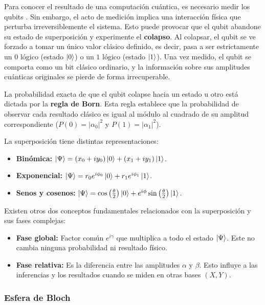Para conocer el resultado de una computación cuántica, es necesario medir los qubits \cite{sholtis_measure_qubits_2019}. Sin embargo, el acto de medición implica una interacción física que perturba irreversiblemente el sistema. Esto puede provocar que el qubit abandone su estado de superposición y experimente el \textbf{colapso}. Al colapsar, el qubit se ve forzado a tomar un único valor clásico definido, es decir, pasa a ser estrictamente un $0$ lógico (estado $\ket{0}$) o un $1$ lógico (estado $\ket{1}$). Una vez medido, el qubit se comporta como un bit clásico ordinario, y la información sobre sus amplitudes cuánticas originales se pierde de forma irrecuperable.

La probabilidad exacta de que el qubit colapse hacia un estado u otro está dictada por la \textbf{regla de Born}. Esta regla establece que la probabilidad de observar cada resultado clásico es igual al módulo al cuadrado de su amplitud correspondiente ($P(0) = |\alpha_0|^2$ y $P(1) = |\alpha_1|^2$).

La superposición tiene distintas representaciones:

\begin{itemize}
    \item \textbf{Binómica:} $\ket{\Psi} = (x_0 + i y_0) \ket{0} + (x_1 + i y_1) \ket{1}$.
    \item \textbf{Exponencial:} $\ket{\Psi} = r_0 e^{i\phi_0} \ket{0} + r_1 e^{i\phi_1} \ket{1}$.
    \item \textbf{Senos y cosenos:} $\ket{\Psi} = \cos\left(\frac{\theta}{2}\right) \ket{0} + e^{i\phi} \sin\left(\frac{\theta}{2}\right) \ket{1}$.
\end{itemize}

Existen otros dos conceptos fundamentales relacionados con la superposición y sus fases complejas:

\begin{itemize}
    \item \textbf{Fase global:} Factor común $e^{i\gamma}$ que multiplica a todo el estado $\ket{\Psi}$. Este no cambia ninguna probabilidad ni resultado físico.
    \item \textbf{Fase relativa:} Es la diferencia entre las amplitudes $\alpha$ y $\beta$. Esto influye a las inferencias y los resultados cuando se miden en otras bases $(X, Y)$.
\end{itemize}


\subsubsection{Esfera de Bloch}

